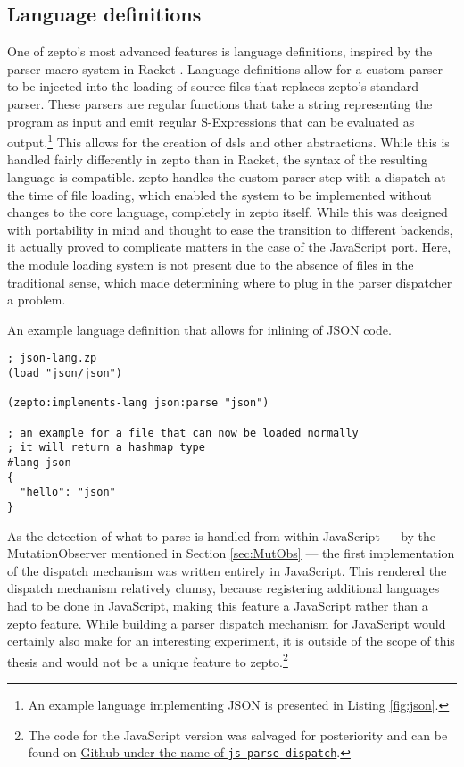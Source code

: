 \documentclass[oneside,11pt,xetex]{scrbook}
\begin{document}
\subsection{Language definitions}

One of zepto's most advanced features is language definitions, inspired by
the parser macro system in Racket \parencite{RPM}. Language definitions allow
for a custom parser to be injected into the loading of source files that replaces
zepto's standard parser. These parsers are regular functions that take a string
representing the program as input and emit regular S-Expressions that can be evaluated
as output.\footnote{An example language implementing JSON is presented in Listing \ref{fig:json}.}
This allows for the creation of \glspl{dsl} and other abstractions.
While this is handled fairly differently in zepto than in Racket, the syntax of the
resulting language is compatible. zepto handles the custom parser step with a dispatch
at the time of file loading, which enabled the system to be implemented without
changes to the core language, completely in zepto itself. While this was
designed with portability in mind and thought to ease the transition to
different backends, it actually proved to complicate matters in the case
of the JavaScript port. Here, the module loading system is not present due
to the absence of files in the traditional sense, which made determining where to
plug in the parser dispatcher a problem.

\begin{listing}[H]
\caption{An example language definition that allows for inlining of JSON code.}
\begin{verbatim}
; json-lang.zp
(load "json/json")

(zepto:implements-lang json:parse "json")

; an example for a file that can now be loaded normally
; it will return a hashmap type
#lang json
{
  "hello": "json"
}
\end{verbatim}
\label{fig:json}
\end{listing}

As the detection of what to parse is handled from within JavaScript --- by the
MutationObserver mentioned in Section \ref{sec:MutObs} --- the first implementation
of the dispatch mechanism was written entirely in JavaScript. This rendered
the dispatch mechanism relatively clumsy, because registering
additional languages had to be done in JavaScript, making this feature
a JavaScript rather than a zepto feature. While building a parser dispatch
mechanism for JavaScript would certainly also make for an interesting experiment,
it is outside  of the scope of this thesis and would not be a unique feature
to zepto.\footnote{The code for the JavaScript version was salvaged for posteriority
and can be found on \href{https://github.com/hellerve/js-parse-dispatch}{Github under
the name of \texttt{js-parse-dispatch}}.}
\end{document}
